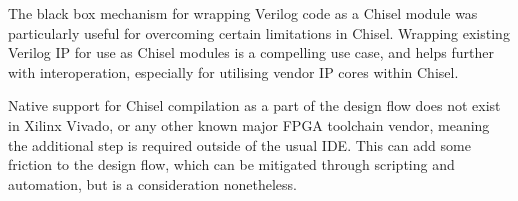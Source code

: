The black box mechanism for wrapping Verilog code as a Chisel module was particularly useful for overcoming certain limitations in Chisel. Wrapping existing Verilog IP for use as Chisel modules is a compelling use case, and helps further with interoperation, especially for utilising vendor IP cores within Chisel.

Native support for Chisel compilation as a part of the design flow does not exist in Xilinx Vivado, or any other known major FPGA toolchain vendor, meaning the additional step is required outside of the usual IDE. This can add some friction to the design flow, which can be mitigated through scripting and automation, but is a consideration nonetheless.

